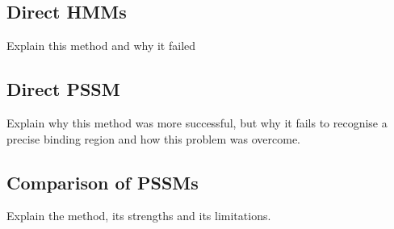 \subsection{Direct HMMs}
\label{sec:hmm_binding}

Explain this method and why it failed

\subsection{Direct PSSM}
\label{sec:pssm_binding}

Explain why this method was more successful, but why it fails to recognise a
precise binding region and how this problem was overcome.

\subsection{Comparison of PSSMs}
\label{sec:pssm_comparison}

Explain the method, its strengths and its limitations.

